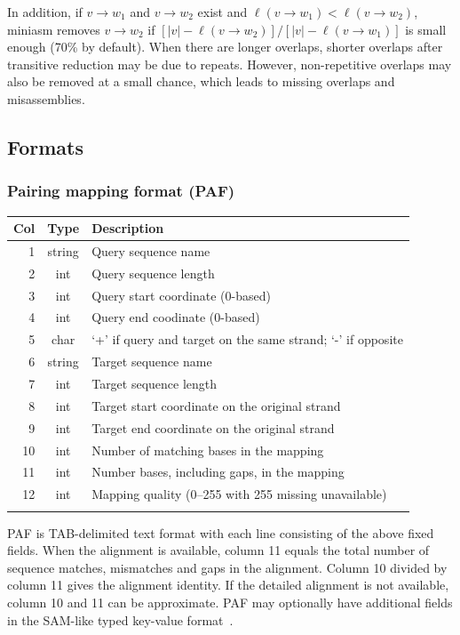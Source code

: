 \documentclass{bioinfo}
\begin{document}
\begin{methods}
In addition, if $v\to w_1$ and $v\to w_2$ exist and $\ell(v\to w_1)<\ell(v\to
w_2)$, miniasm removes $v\to w_2$ if $[|v|-\ell(v\to w_2)]/[|v|-\ell(v\to
w_1)]$ is small enough (70\% by default). When there are longer overlaps,
shorter overlaps after transitive reduction may be due to repeats.
However, non-repetitive overlaps may also be removed at a small chance, which
leads to missing overlaps and misassemblies.

\subsection{Formats}

\subsubsection{Pairing mapping format (PAF)}

\begin{table}[ht]\label{tab:paf}
{\footnotesize
\begin{tabular}{rcl}
\toprule
Col & Type & Description \\
\midrule
1 & string & Query sequence name \\
2 & int    & Query sequence length \\
3 & int    & Query start coordinate (0-based) \\
4 & int    & Query end coodinate (0-based) \\
5 & char   & `+' if query and target on the same strand; `-' if opposite \\
6 & string & Target sequence name \\
7 & int    & Target sequence length \\
8 & int    & Target start coordinate on the original strand \\
9 & int    & Target end coordinate on the original strand \\
10& int    & Number of matching bases in the mapping \\
11& int    & Number bases, including gaps, in the mapping \\
12& int    & Mapping quality (0--255 with 255 missing unavailable) \\
\botrule
\end{tabular}
}{PAF is TAB-delimited text format with each line consisting of the above fixed
fields. When the alignment is available, column 11 equals the total number of
sequence matches, mismatches and gaps in the alignment. Column 10 divided by
column 11 gives the alignment identity. If the detailed alignment is not
available, column 10 and 11 can be approximate. PAF may optionally have
additional fields in the SAM-like typed key-value format~\citep{Li:2009ys}.}
\end{table}


\end{methods}
\end{document}
